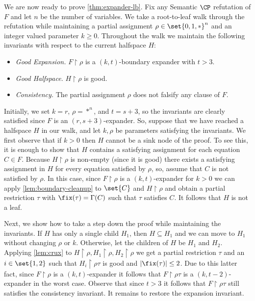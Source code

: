 \documentclass[11pt]{article}
\begin{document}
	We are now ready to prove \autoref{thm:expander-lb}.
	Fix any Semantic $\CP$ refutation of $F$ and let $n$ be the number of variables.
	We take a root-to-leaf walk through the refutation while maintaining a partial assignment $\rho \in \set{0,1,*}^n$ and an integer valued parameter $k \geq 0$.
	Throughout the walk we maintain the following invariants with respect to the current halfspace $H$: 
	\begin{itemize}
		\item[--] \emph{Good Expansion.} $F \restriction \rho$ is a $(k, t)$-boundary expander with $t > 3$.
		\item[--] \emph{Good Halfspace.} $H \restriction \rho$ is good.
		\item[--] \emph{Consistency.} The partial assignment $\rho$ does not falsify any clause of $F$.
	\end{itemize}
	
	Initially, we set $k = r$, $\rho = *^n$, and $t=s+3$, so the invariants are clearly satisfied since $F$ is an $(r, s+3)$-expander.
	So, suppose that we have reached a halfspace $H$ in our walk, and let $k, \rho$ be parameters satisfying the invariants.
	We first observe that if $k > 0$ then $H$ cannot be a sink node of the proof.
	To see this, it is enough to show that $H$ contains a satisfying assignment for each equation $C \in F$. 
	Because $H \restriction \rho$ is non-empty (since it is good) there exists a satisfying assignment in $H$ for every equation satisfied by $\rho$, so, 	assume that $C$ is not satisfied by $\rho$. 
	In this case, since $F \restriction \rho$ is a $(k, t)$-expander for $k>0$ we can apply \autoref{lem:boundary-cleanup} to $\set{C}$ and $H \restriction \rho$ and obtain a partial restriction $\tau$ with $\fix(\tau) = \Gamma(C)$ such that $\tau$ satisfies $C$.
	It follows that $H$ is not a leaf.

	Next, we show how to take a step down the proof while maintaining the invariants. 
	If $H$ has only a single child $H_1$, then $H \subseteq H_1$ and we can move to $H_1$ without changing $\rho$ or $k$.
	Otherwise, let the children of $H$ be $H_1$ and $H_2$. 
	Applying \autoref{lem:crux} to $H \restriction \rho, H_1 \restriction \rho, H_2 \restriction \rho$ we get a partial restriction $\tau$ and an $i \in \set{1,2}$ such that $H_i \restriction \rho\tau$ is good and $|\fix(\tau)| \leq 2$.
	Due to this latter fact, since $F \restriction \rho$ is a $(k, t)$-expander it follows that $F \restriction \rho\tau$ is a $(k, t-2)$-expander in the worst case.
	Observe that since $t > 3$ it follows that $F \restriction \rho\tau$ still satisfies the consistency invariant.
	It remains to restore the expansion invariant.
\end{document}
